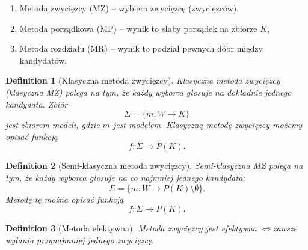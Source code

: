 \documentclass[12pt,a4paper]{article}
\theoremstyle{break}
\newtheorem{definition}{Definition}[section]
\newcommand{\witw}{$\Leftrightarrow$}
\begin{document}
\begin{enumerate}[1)]
	\item Metoda zwycięzcy (MZ) – wybiera zwycięzcę (zwycięzców),
	\item Metoda porządkowa (MP) – wynik to słaby porządek na zbiorze $K$,
	\item Metoda rozdziału (MR) – wynik to podział pewnych dóbr między kandydatów.
\end{enumerate}

\begin{definition}[Klasyczna metoda zwycięzcy]
	Klasyczna metoda zwycięzcy (klasyczna MZ) polega na tym, że każdy wyborca głosuje na dokładnie jednego kandydata. Zbiór
	$$\Sigma = \{m:W\rightarrow K\}$$
	jest zbiorem modeli, gdzie $m$ jest modelem. Klasyczną metodę zwycięzcy możemy opisać funkcją
	$$f: \Sigma \rightarrow P(K).$$
\end{definition}

\begin{definition}[Semi-klasyczna metoda zwycięzcy]
	Semi-klasyczna MZ polega na tym, że każdy wyborca głosuje na co najmniej jednego kandydata:
	$$\Sigma = \{m:W\rightarrow P(K)\setminus \emptyset\}.$$
	Metodę tę można opisać funkcją
	$$f: \Sigma \rightarrow P(K).$$
\end{definition}

\begin{definition}[Metoda efektywna]
	Metoda zwycięzcy jest efektywna \witw zawsze wyłania przynajmniej jednego zwycięzcę.
\end{definition}
\end{document}
